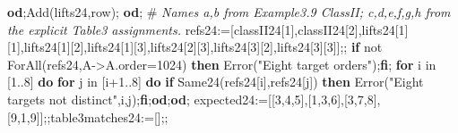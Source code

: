\documentclass[
  10pt,
  letterpaper,
]{article}
\newenvironment{Shaded}{}{}
\newcommand{\BuiltInTok}[1]{\textcolor[rgb]{0.00,0.50,0.00}{#1}}
\newcommand{\CommentTok}[1]{\textcolor[rgb]{0.38,0.63,0.69}{\textit{#1}}}
\newcommand{\ConstantTok}[1]{\textcolor[rgb]{0.53,0.00,0.00}{#1}}
\newcommand{\ControlFlowTok}[1]{\textcolor[rgb]{0.00,0.44,0.13}{\textbf{#1}}}
\newcommand{\ExtensionTok}[1]{#1}
\newcommand{\FloatTok}[1]{\textcolor[rgb]{0.25,0.63,0.44}{#1}}
\newcommand{\NormalTok}[1]{#1}
\newcommand{\OperatorTok}[1]{\textcolor[rgb]{0.40,0.40,0.40}{#1}}
\newcommand{\StringTok}[1]{\textcolor[rgb]{0.25,0.44,0.63}{#1}}
\newcommand{\VariableTok}[1]{\textcolor[rgb]{0.10,0.09,0.49}{#1}}
\begin{document}
\begin{Shaded}
\begin{Highlighting}[]
 \ControlFlowTok{od}\OperatorTok{;}\BuiltInTok{Add}\NormalTok{(}\VariableTok{lifts24}\OperatorTok{,}\VariableTok{row}\NormalTok{)}\OperatorTok{;}
\ControlFlowTok{od}\OperatorTok{;}
\NormalTok{\#}\CommentTok{ Names a,b from Example3.9 ClassII; c,d,e,f,g,h from the explicit Table3 assignments.}
\VariableTok{refs24}\OperatorTok{:=}\NormalTok{[}\VariableTok{classII24}\NormalTok{[}\FloatTok{1}\NormalTok{]}\OperatorTok{,}\VariableTok{classII24}\NormalTok{[}\FloatTok{2}\NormalTok{]}\OperatorTok{,}\VariableTok{lifts24}\NormalTok{[}\FloatTok{1}\NormalTok{][}\FloatTok{1}\NormalTok{]}\OperatorTok{,}\VariableTok{lifts24}\NormalTok{[}\FloatTok{1}\NormalTok{][}\FloatTok{2}\NormalTok{]}\OperatorTok{,}\VariableTok{lifts24}\NormalTok{[}\FloatTok{1}\NormalTok{][}\FloatTok{3}\NormalTok{]}\OperatorTok{,}\VariableTok{lifts24}\NormalTok{[}\FloatTok{2}\NormalTok{][}\FloatTok{3}\NormalTok{]}\OperatorTok{,}\VariableTok{lifts24}\NormalTok{[}\FloatTok{3}\NormalTok{][}\FloatTok{2}\NormalTok{]}\OperatorTok{,}\VariableTok{lifts24}\NormalTok{[}\FloatTok{3}\NormalTok{][}\FloatTok{3}\NormalTok{]]}\OperatorTok{;;}
\ControlFlowTok{if} \ConstantTok{not} \BuiltInTok{ForAll}\NormalTok{(}\VariableTok{refs24}\OperatorTok{,}\VariableTok{A}\OperatorTok{{-}\textgreater{}}\VariableTok{A}\NormalTok{.}\VariableTok{order}\OperatorTok{=}\FloatTok{1024}\NormalTok{) }\ControlFlowTok{then} \BuiltInTok{Error}\NormalTok{(}\StringTok{"Eight target orders"}\NormalTok{)}\OperatorTok{;}\ControlFlowTok{fi}\OperatorTok{;}
\ControlFlowTok{for} \VariableTok{i} \ExtensionTok{in}\NormalTok{ [}\FloatTok{1}\OperatorTok{..}\FloatTok{8}\NormalTok{] }\ControlFlowTok{do} \ControlFlowTok{for} \VariableTok{j} \ExtensionTok{in}\NormalTok{ [}\VariableTok{i}\OperatorTok{+}\FloatTok{1}\OperatorTok{..}\FloatTok{8}\NormalTok{] }\ControlFlowTok{do} \ControlFlowTok{if} \VariableTok{Same24}\NormalTok{(}\VariableTok{refs24}\NormalTok{[}\VariableTok{i}\NormalTok{]}\OperatorTok{,}\VariableTok{refs24}\NormalTok{[}\VariableTok{j}\NormalTok{]) }\ControlFlowTok{then} \BuiltInTok{Error}\NormalTok{(}\StringTok{"Eight targets not distinct"}\OperatorTok{,}\VariableTok{i}\OperatorTok{,}\VariableTok{j}\NormalTok{)}\OperatorTok{;}\ControlFlowTok{fi}\OperatorTok{;}\ControlFlowTok{od}\OperatorTok{;}\ControlFlowTok{od}\OperatorTok{;}
\VariableTok{expected24}\OperatorTok{:=}\NormalTok{[[}\FloatTok{3}\OperatorTok{,}\FloatTok{4}\OperatorTok{,}\FloatTok{5}\NormalTok{]}\OperatorTok{,}\NormalTok{[}\FloatTok{1}\OperatorTok{,}\FloatTok{3}\OperatorTok{,}\FloatTok{6}\NormalTok{]}\OperatorTok{,}\NormalTok{[}\FloatTok{3}\OperatorTok{,}\FloatTok{7}\OperatorTok{,}\FloatTok{8}\NormalTok{]}\OperatorTok{,}\NormalTok{[}\FloatTok{9}\OperatorTok{,}\FloatTok{1}\OperatorTok{,}\FloatTok{9}\NormalTok{]]}\OperatorTok{;;}\VariableTok{table3matches24}\OperatorTok{:=}\NormalTok{[]}\OperatorTok{;;}

\end{Highlighting}
\end{Shaded}
\end{document}
